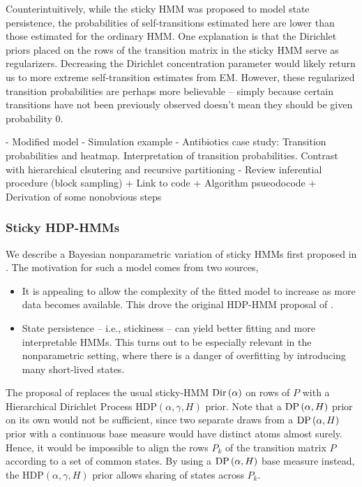 \documentclass{article}
\begin{document}
Counterintuitively, while the sticky HMM was proposed to model state
persistence, the probabilities of self-transitions estimated here are lower than
those estimated for the ordinary HMM. One explanation is that the Dirichlet
priors placed on the rows of the transition matrix in the sticky HMM serve as
regularizers. Decreasing the Dirichlet concentration parameter would likely
return us to more extreme self-transition estimates from EM. However, these
regularized transition probabilities are perhaps more believable -- simply
because certain transitions have not been previously observed doesn't mean they
should be given probability 0.

- Modified model
- Simulation example
- Antibiotics case study: Transition probabilities and heatmap. Interpretation
of transition probabilities. Contrast with hierarchical clsutering and recursive
partitioning
- Review inferential procedure (block sampling)
  + Link to code
  + Algorithm psueodocode
  + Derivation of some nonobvious steps

\subsubsection{Sticky HDP-HMMs}
\label{sec:sticky_hdp_hmm}

We describe a Bayesian nonparametric variation of sticky HMMs first proposed in
\citep{fox2008hdp}. The motivation for such a model comes from two sources,

\begin{itemize}
\item It is appealing to allow the complexity of the fitted model to increase as
  more data becomes available. This drove the original HDP-HMM proposal of
  \citep{teh2006hierarchical}.
\item State persistence -- i.e., stickiness -- can yield better fitting and more
  interpretable HMMs. This turns out to be especially relevant in the
  nonparametric setting, where there is a danger of overfitting by introducing
  many short-lived states.
\end{itemize}

The proposal of \citep{teh2006hierarchical} replaces the usual sticky-HMM
$\textnormal{Dir}\left(\alpha\right)$ on rows of $P$ with a Hierarchical Dirichlet Process
$\text{HDP}\left(\alpha, \gamma, H\right)$ prior. Note that a $\textnormal{DP}\left(\alpha,
H\right)$ prior on its own would not be sufficient, since two separate draws
from a $\textnormal{DP}\left(\alpha, H\right)$ prior with a continuous base measure would
have distinct atoms almost surely. Hence, it would be impossible to align the
rows $P_{k}$ of the transition matrix $P$ according to a set of common states.
By using a $\textnormal{DP}\left(\alpha, H\right)$ base measure instead, the
$\text{HDP}\left(\alpha, \gamma, H\right)$ prior allows sharing of states across
$P_{k}$.
\end{document}
